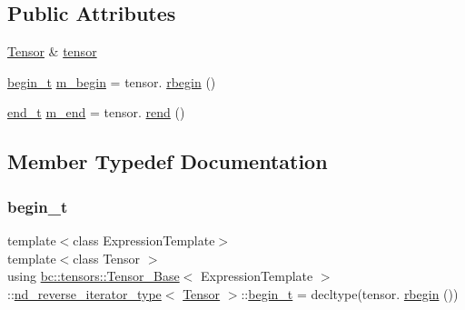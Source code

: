 \subsection*{Public Attributes}
\begin{DoxyCompactItemize}
\item 
\hyperlink{namespacebc_a659391e47ab612be3ba6c18cf9c89159}{Tensor} \& \hyperlink{structbc_1_1tensors_1_1Tensor__Base_1_1nd__reverse__iterator__type_ad5caacf58cdc449c5397914f932cbe12}{tensor}
\item 
\hyperlink{structbc_1_1tensors_1_1Tensor__Base_1_1nd__reverse__iterator__type_ae1257b60d15e216d87339e89db5df9bc}{begin\+\_\+t} \hyperlink{structbc_1_1tensors_1_1Tensor__Base_1_1nd__reverse__iterator__type_ae7d89c30cdac33719395df2c5d69cd50}{m\+\_\+begin} = tensor. \hyperlink{classbc_1_1tensors_1_1Tensor__Base_ac00d10e279006dbdd13345d73824424c}{rbegin} ()
\item 
\hyperlink{structbc_1_1tensors_1_1Tensor__Base_1_1nd__reverse__iterator__type_a67cf55832f75d57560aa163bdaa89217}{end\+\_\+t} \hyperlink{structbc_1_1tensors_1_1Tensor__Base_1_1nd__reverse__iterator__type_a48e79a63016171ae516e811938d7dc17}{m\+\_\+end} = tensor. \hyperlink{classbc_1_1tensors_1_1Tensor__Base_a91727f32f3b0182772ebb7968259c5e1}{rend} ()
\end{DoxyCompactItemize}


\subsection{Member Typedef Documentation}
\mbox{\label{structbc_1_1tensors_1_1Tensor__Base_1_1nd__reverse__iterator__type_ae1257b60d15e216d87339e89db5df9bc}} 
\subsubsection{\texorpdfstring{begin\+\_\+t}{begin\_t}}
{\footnotesize\ttfamily template$<$class Expression\+Template$>$ \\
template$<$class Tensor $>$ \\
using \hyperlink{classbc_1_1tensors_1_1Tensor__Base}{bc\+::tensors\+::\+Tensor\+\_\+\+Base}$<$ Expression\+Template $>$\+::\hyperlink{structbc_1_1tensors_1_1Tensor__Base_1_1nd__reverse__iterator__type}{nd\+\_\+reverse\+\_\+iterator\+\_\+type}$<$ \hyperlink{namespacebc_a659391e47ab612be3ba6c18cf9c89159}{Tensor} $>$\+::\hyperlink{structbc_1_1tensors_1_1Tensor__Base_1_1nd__reverse__iterator__type_ae1257b60d15e216d87339e89db5df9bc}{begin\+\_\+t} =  decltype(tensor. \hyperlink{classbc_1_1tensors_1_1Tensor__Base_ac00d10e279006dbdd13345d73824424c}{rbegin} ())}

